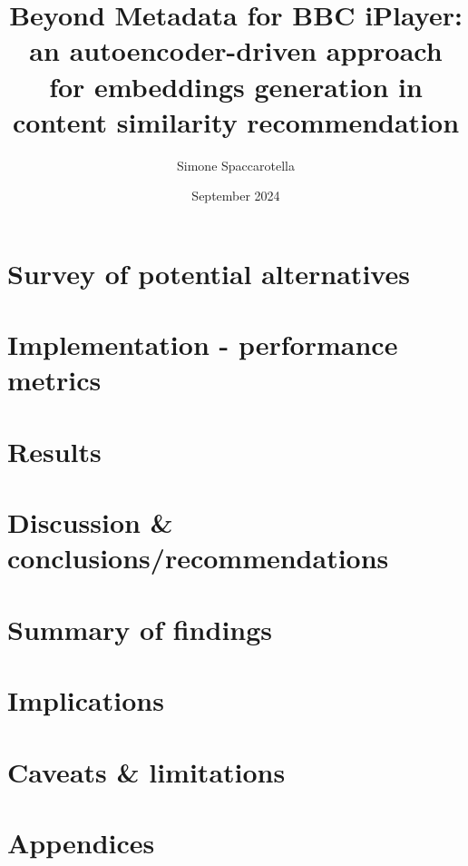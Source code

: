 \documentclass[12pt,a4paper]{article}
\begin{document}
\title{Beyond Metadata for BBC iPlayer:\\an autoencoder-driven approach for embeddings generation in content similarity recommendation}
\author{Simone Spaccarotella}
\date{September 2024}

\maketitle
\tableofcontents











\section{Survey of potential alternatives}

\section{Implementation - performance metrics}

\section{Results}

\section{Discussion \& conclusions/recommendations}

\section{Summary of findings}

\section{Implications}

\section{Caveats \& limitations}

\section{Appendices}



\end{document}
